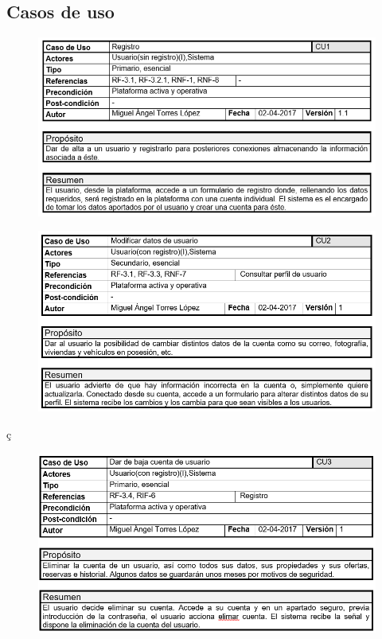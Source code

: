 \clearpage

\subsection{Casos de uso}

	\begin{figure}[h!]
		\centering
		\includegraphics[width=0.95\linewidth]{img/casos/usuarios/Gestion_usuarios_registro}
		\label{fig:gestionusuariosregistro}
	\end{figure}
	
	\begin{figure}[h!]
		\centering
		\includegraphics[width=0.94\linewidth]{img/casos/usuarios/Gestion_usuarios_modificar_datos}
		\label{fig:gestionusuariosmodificardatos}
	\end{figure}ç
\clearpage
	\begin{figure}[h!]
		\centering
		\includegraphics[width=0.95\linewidth]{img/casos/usuarios/Gestion_usuarios_dar_de_baja}
		\label{fig:gestionusuariosdardebaja}
	\end{figure}
	
